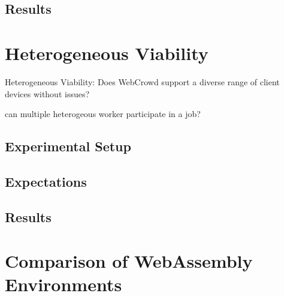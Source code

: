 \subsection{Results}

\section{Heterogeneous Viability}
\label{sec:evaluation:heterogen}
Heterogeneous Viability: Does WebCrowd support a diverse range of client devices without issues?

can multiple heterogeous worker participate in a job?

\subsection{Experimental Setup}

\subsection{Expectations}

\subsection{Results}

\section{Comparison of WebAssembly Environments}
\label{sec:evaluation:languages}
